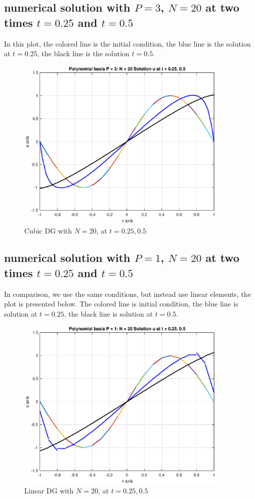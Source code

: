 \documentclass[12pt]{article} %
\newcommand{\1}[1]{\mathds{1}\left[#1\right]}
\begin{document}
\subsection{numerical solution with $P=3$, $N = 20$ at two times $t = 0.25$ and $t = 0.5$}
\indent \indent In this plot, the colored line is the initial condition, the blue line is the solution at $t = 0.25$, the black line is the solution $t = 0.5$.
\newpage
\begin{figure}[t]
\includegraphics[width=10cm]{p3a.eps}
\centering
\caption{Cubic DG with $N=20$, at $t = 0.25, 0.5$}
\end{figure}
\newpage

\subsection{numerical solution with $P = 1$, $N = 20$ at two times $t = 0.25$ and $t = 0.5$}
In comparison, we use the same conditions, but instead use linear elements, the plot is presented below. The colored line is initial condition, the blue line is solution at $t = 0.25$, the black line is solution at $t = 0.5$.
\newpage
\begin{figure}[t]
\includegraphics[width=10cm]{p3b.eps}
\centering
\caption{Linear DG with $N=20$, at $t=0.25,0.5$}
\end{figure}
\newpage
\end{document}
